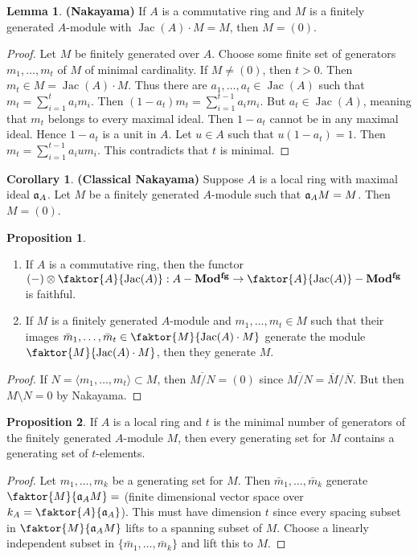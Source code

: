 \documentclass[10pt,letterpaper,cm]{nupset}
\theoremstyle{definition}
\newtheorem{prop}{Proposition}
\newtheorem{corollary}{Corollary}
\newtheorem{lemma}{Lemma}
\newcommand{\1}{\mathbf{1}}
\newcommand{\0}{\vec 0}
\DeclareMathOperator{\Jac}{Jac}
\begin{document}
\begin{lemma}{\textbf{(Nakayama)}}
If $A$ is a commutative ring and $M$ is a finitely generated $A$-module with $\Jac(A) \cdot M = M$, then $M= (0)$.
\end{lemma}
\begin{proof}
Let $M$ be finitely generated over $A$. Choose some finite set of generators $m_1, \ldots, m_t$ of $M$ of minimal cardinality. If $M\ne (0)$, then $t>0$. Then $m_t \in M = \Jac(A)\cdot M$. Thus there are $a_1, \ldots, a_t \in \Jac(A)$ such that $m_t = \sum_{i=1}^t a_im_i$. Then $(1-a_t)m_t = \sum_{i=1}^{t-1} a_im_i$. But $a_t \in \Jac(A)$, meaning that $m_t$ belongs to every maximal ideal. Then $1-a_t$ cannot be in any maximal ideal. Hence $1-a_t$ is a unit in $A$. Let $u\in A$ such that $u(1-a_t) = 1$. Then $m_t = \sum_{i=1}^{t-1} a_iu m_i$. This contradicts that $t$ is minimal.
\end{proof}

\begin{corollary}{\textbf{(Classical Nakayama)}}
Suppose $A$ is a local ring with maximal ideal $\frak{a}_A$. Let $M$ be a finitely generated $A$-module such that $\frak{a}_AM = M$. Then $M= (0)$. 
\end{corollary}

\begin{prop} $ $
\begin{enumerate}
\item If $A$ is a commutative ring,  then the functor $(-) \otimes \faktor{A}{\Jac(A)} : A-\mathbf{Mod^{fg}} \to \faktor{A}{\Jac(A)} - \mathbf{Mod^{fg}}$ is faithful.  
\item If $M$ is a finitely generated $A$-module and $m_1, \ldots, m_t \in M$ such that their images $\bar{m}_1, \ldots, \bar{m}_t \in \faktor{M}{\Jac(A) \cdot M}$ generate the module $\faktor{M}{\Jac(A)\cdot M}$, then they generate $M$.
\end{enumerate}
\end{prop}
\begin{proof}
If $N = \langle m_1, \ldots, m_t \rangle \subset M$, then $\overline{M/N} = (0)$ since $\overline{M/N} = \overline{M}/\overline{N}$. But then $M \setminus N = 0$ by Nakayama. 
\end{proof}

\begin{prop}
If $A$ is a local ring and $t$ is the minimal number of generators of the finitely generated $A$-module $M$, then every generating set for $M$ contains a generating set of $t$-elements. 
\end{prop}
\begin{proof}
Let $m_1, \ldots, m_k$ be a generating set for $M$. Then $\bar{m}_1, \ldots, \bar{m}_k$ generate $\faktor{M}{\frak{a}_A M} =$ (finite dimensional vector space over $k_A = \faktor{A}{\frak{a}_A}$). This must have dimension $t$ since every spacing subset in $\faktor{M}{\frak{a}_A M}$ lifts to a spanning subset of $M$. Choose a linearly independent subset in $\{\bar{m}_1, \ldots, \bar{m}_k\}$ and lift this to $M$.
\end{proof}
\end{document}
